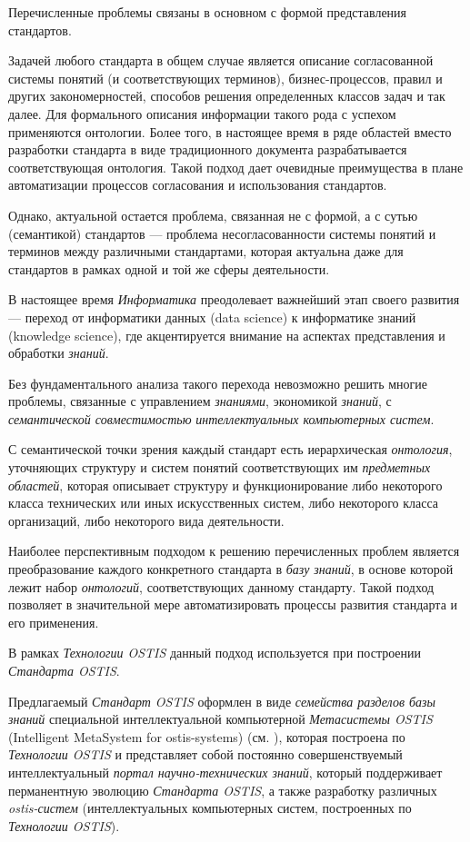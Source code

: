 Перечисленные проблемы связаны в основном с формой представления стандартов. 

Задачей любого стандарта в общем случае является описание согласованной системы понятий (и соответствующих терминов), бизнес-процессов, правил и других закономерностей, способов решения определенных классов задач и так далее. Для формального описания информации такого рода с успехом применяются онтологии. Более того, в настоящее время в ряде областей вместо разработки стандарта в виде традиционного документа разрабатывается соответствующая онтология. Такой подход дает очевидные преимущества в плане автоматизации процессов согласования и использования стандартов.

Однако, актуальной остается проблема, связанная не с формой, а с сутью (семантикой) стандартов --- проблема несогласованности системы понятий и терминов между различными стандартами, которая актуальна даже для стандартов в рамках одной и той же сферы деятельности.

В настоящее время \textit{Информатика} преодолевает важнейший этап своего развития --- переход от информатики данных (data science) к информатике знаний (knowledge science), где акцентируется внимание на  аспектах представления и обработки \textit{знаний}.

Без фундаментального анализа такого перехода невозможно решить многие проблемы, связанные с управлением \textit{знаниями}, экономикой \textit{знаний}, с \textit{семантической совместимостью} \textit{интеллектуальных компьютерных систем}.

С семантической точки зрения каждый стандарт есть иерархическая \textit{онтология}, уточняющих структуру и систем понятий соответствующих им \textit{предметных областей}, которая описывает структуру и функционирование либо некоторого класса технических или иных искусственных систем, либо некоторого класса организаций, либо некоторого вида деятельности. 

Наиболее перспективным подходом к решению перечисленных проблем является преобразование каждого конкретного стандарта в \textit{базу знаний}, в основе которой лежит набор \textit{онтологий}, соответствующих данному стандарту. Такой подход позволяет в значительной мере автоматизировать процессы развития стандарта и его применения.

В рамках \textit{Технологии OSTIS} данный подход используется при построении \textit{Стандарта OSTIS}.
 
Предлагаемый \textit{Стандарт OSTIS} оформлен в виде \textit{семейства разделов базы знаний} специальной интеллектуальной компьютерной \textit{Метасистемы OSTIS} (Intelligent MetaSystem for ostis-systems) (см. ), которая построена по \textit{Технологии OSTIS} и представляет собой постоянно совершенствуемый интеллектуальный \textit{портал научно-технических знаний}, который поддерживает перманентную эволюцию \textit{Стандарта OSTIS}, а также разработку различных \textit{ostis-систем} (интеллектуальных компьютерных систем, построенных по \textit{Технологии OSTIS}).


